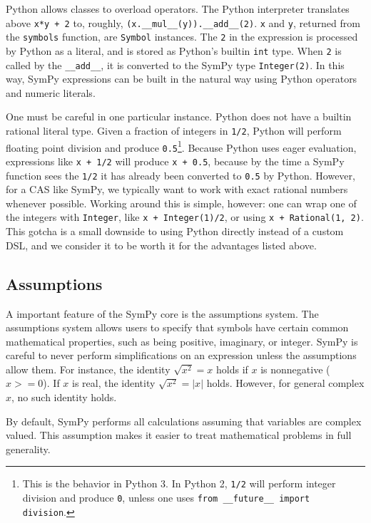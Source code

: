 Python allows classes to overload operators. The Python interpreter translates
above \texttt{x*y + 2} to, roughly,
\verb|(x.__mul__(y)).__add__(2)|. \texttt{x} and \texttt{y}, returned from
the \texttt{symbols} function, are \texttt{Symbol} instances. The \texttt{2}
in the expression is processed by Python as a literal, and is stored as
Python's builtin \texttt{int} type. When \texttt{2} is called by the
\verb|__add__|, it is converted to the SymPy type \texttt{Integer(2)}. In
this way, SymPy expressions can be built in the natural way using Python
operators and numeric literals.

One must be careful in one particular instance. Python does not have a builtin
rational literal type. Given a fraction of integers in \texttt{1/2}, Python
will perform floating point division and produce \texttt{0.5}\footnote{This is
  the behavior in Python 3. In Python 2, \texttt{1/2} will perform integer
  division and produce \texttt{0}, unless one uses \texttt{from \_\_future\_\_
    import division}.}. Because Python uses eager evaluation, expressions like
\texttt{x + 1/2} will produce \texttt{x + 0.5}, because by the time a SymPy
function sees the \texttt{1/2} it has already been converted to \texttt{0.5}
by Python. However, for a CAS like SymPy, we typically want to work with exact
rational numbers whenever possible. Working around this is simple, however:
one can wrap one of the integers with \texttt{Integer}, like \texttt{x +
  Integer(1)/2}, or using \texttt{x + Rational(1, 2)}. This gotcha is a small
downside to using Python directly instead of a custom DSL, and we consider it
to be worth it for the advantages listed above.

\subsection{Assumptions}

A important feature of the SymPy core is the assumptions system. The
assumptions system allows users to specify that symbols have certain common
mathematical properties, such as being positive, imaginary, or integer. SymPy
is careful to never perform simplifications on an expression unless the
assumptions allow them. For instance, the identity $\sqrt{x^2} = x$ holds if
$x$ is nonnegative ($x>=0$). If $x$ is real, the identity $\sqrt{x^2}=|x|$
holds. However, for general complex $x$, no such identity holds.

By default, SymPy performs all calculations assuming that variables are
complex valued. This assumption makes it easier to treat mathematical problems
in full generality.


